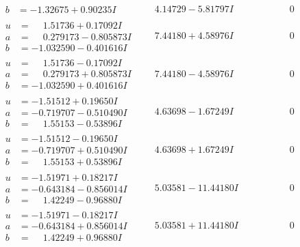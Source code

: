 \documentclass[1p]{elsarticle_modified}
\theoremstyle{definition}
\begin{document}
$$\begin{array}{c|c|c}
\begin{aligned}
b &= -1.32675 + 0.90235 I\end{aligned}
 & \phantom{-}4.14729 - 5.81797 I & \phantom{-0.000000 } 0 \\ \hline\begin{aligned}
u &= \phantom{-}1.51736 + 0.17092 I \\
a &= \phantom{-}0.279173 - 0.805873 I \\
b &= -1.032590 - 0.401616 I\end{aligned}
 & \phantom{-}7.44180 + 4.58976 I & \phantom{-0.000000 } 0 \\ \hline\begin{aligned}
u &= \phantom{-}1.51736 - 0.17092 I \\
a &= \phantom{-}0.279173 + 0.805873 I \\
b &= -1.032590 + 0.401616 I\end{aligned}
 & \phantom{-}7.44180 - 4.58976 I & \phantom{-0.000000 } 0 \\ \hline\begin{aligned}
u &= -1.51512 + 0.19650 I \\
a &= -0.719707 - 0.510490 I \\
b &= \phantom{-}1.55153 - 0.53896 I\end{aligned}
 & \phantom{-}4.63698 - 1.67249 I & \phantom{-0.000000 } 0 \\ \hline\begin{aligned}
u &= -1.51512 - 0.19650 I \\
a &= -0.719707 + 0.510490 I \\
b &= \phantom{-}1.55153 + 0.53896 I\end{aligned}
 & \phantom{-}4.63698 + 1.67249 I & \phantom{-0.000000 } 0 \\ \hline\begin{aligned}
u &= -1.51971 + 0.18217 I \\
a &= -0.643184 - 0.856014 I \\
b &= \phantom{-}1.42249 - 0.96880 I\end{aligned}
 & \phantom{-}5.03581 - 11.44180 I & \phantom{-0.000000 } 0 \\ \hline\begin{aligned}
u &= -1.51971 - 0.18217 I \\
a &= -0.643184 + 0.856014 I \\
b &= \phantom{-}1.42249 + 0.96880 I\end{aligned}
 & \phantom{-}5.03581 + 11.44180 I & \phantom{-0.000000 } 0 \\ \hline\begin{aligned}

\end{aligned}
\end{array}$$
\end{document}
